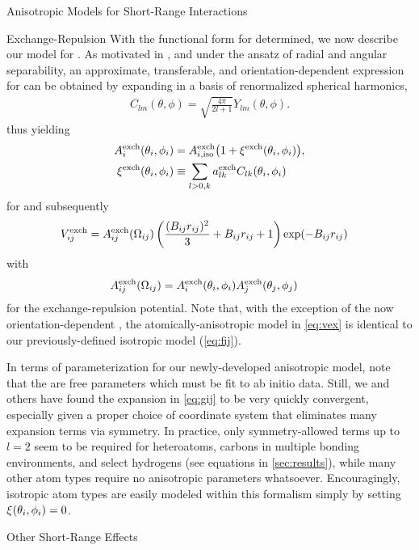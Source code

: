 \begin{subsection}{Anisotropic Models for Short-Range Interactions}
\begin{subsubsection}{Exchange-Repulsion}
With the functional form for \fij determined, we now describe our
model for \gij. As motivated in , and under
the ansatz of radial and angular separability,
an approximate, transferable, and orientation-dependent expression for  can be obtained
by expanding  in a
basis of 
renormalized spherical harmonics,
\begin{align}
\label{eq:sph_harm}
C_{lm}(\theta,\phi) = \sqrt{\frac{4\pi}{2l+1}}Y_{lm}(\theta,\phi).
\end{align}
thus yielding
%
\begin{align}
\label{eq:gij}
\begin{split}
A^{\text{exch}}_{i}(\theta_i,\phi_i) &= 
A^{\text{exch}}_{i,\text{iso}}\big(1 + \xi^{\text{exch}}(\theta_i,\phi_i) \big), \\
\xi^{\text{exch}}(\theta_i,\phi_i) &\equiv \sum\limits_{l>0,k} a_{lk}^{\text{exch}}  C_{lk}(\theta_i,\phi_i)
\end{split}
\end{align}
%
for  and subsequently
%
\begin{align}
\label{eq:vex}
V^{\text{exch}}_{ij} &= A^{\text{exch}}_{ij}(\Omega_{ij})
        \left( \frac{ (B_{ij}r_{ij})^2}{3} + B_{ij}r_{ij} + 1 \right) \exp(-B_{ij}r_{ij})
\end{align}
with
\begin{align}
A^{\text{exch}}_{ij}(\Omega_{ij}) &= A^{\text{exch}}_{i}(\theta_i,\phi_i)A^{\text{exch}}_{j}(\theta_j,\phi_j)
\end{align}
%
for the exchange-repulsion potential. Note that, with the exception of the
now orientation-dependent , the atomically-anisotropic model in \cref{eq:vex} is identical to
our previously-defined isotropic model (\cref{eq:fij}). 

In terms of parameterization for our newly-developed anisotropic model, note
that the \aex are free parameters which must be fit to ab initio
data. 
Still, we and others have found the expansion in \cref{eq:gij} to be very quickly convergent,
\cite{Stone2007,Mitchell2001,Price2000,Stone1988,Day2003,Torheyden2006,Totton2010,Misquitta2016,Price2010a}
 especially given a proper choice of coordinate
system that eliminates many expansion terms via symmetry. In practice, only
symmetry-allowed terms up
to $l=2$ seem to be required for heteroatoms, carbons in multiple bonding
environments, and select hydrogens (see
equations in \cref{sec:results}), while many other atom types require no anisotropic
parameters whatsoever. Encouragingly,
isotropic atom types are easily modeled within
this formalism simply by setting $\xi^{\text{}}(\theta_i,\phi_i) = 0$.

\end{subsubsection}
\begin{subsubsection}{Other Short-Range Effects}


\end{subsubsection}
\end{subsection}

